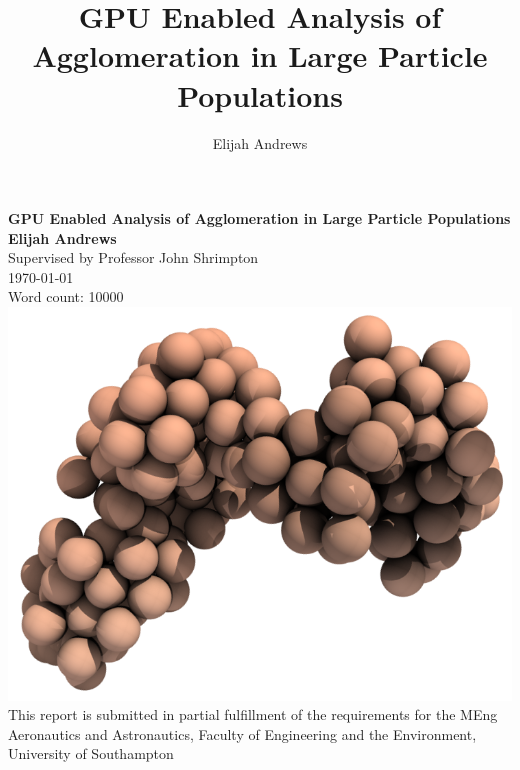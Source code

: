 \documentclass[a4paper,11pt,titlepage]{report}
\author{Elijah Andrews}
\title{GPU Enabled Analysis of Agglomeration in Large Particle Populations}
\begin{document}
\begin{titlepage}
    \begin{center}
        \vspace*{1cm}
        \Huge\textbf{GPU Enabled Analysis of Agglomeration in Large Particle Populations}
        \vspace{1.5cm}
        \\\Large\textbf{Elijah Andrews}
        \vspace{0.5cm}
        \\Supervised by Professor John Shrimpton
        \vspace{0.5cm}
        \\\today
        \vspace{0.5cm}
        \\Word count: 10000
        \vspace{1.5cm}
        \\\includegraphics[scale=0.55]{figures/front_page.png}
        \vfill
        \normalsize This report is submitted in partial fulfillment of the requirements for the MEng Aeronautics and Astronautics, Faculty of Engineering and the Environment, University of Southampton
        \vspace{0.8cm}
    \end{center}
\end{titlepage}
\end{document}
